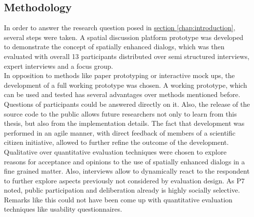 \subsection{Methodology}
\label{sub:method-discussion}
In order to answer the research question posed in \hyperref[chap:introduction]{section \ref{chap:introduction}}, several steps were taken. A spatial discussion platform prototype was developed to demonstrate the concept of spatially enhanced dialogs, which was then evaluated with overall 13 participants distributed over semi structured interviews, expert interviews and a focus group.\\
In opposition to methods like paper prototyping or interactive mock ups, the development of a full working prototype was chosen. A working prototype, which can be used and tested has several advantages over methods mentioned before. Questions of participants could be answered directly on it. Also, the release of the source code to the public allows future researchers not only to learn from this thesis, but also from the implementation details. The fact that development was performed in an agile manner, with direct feedback of members of a scientific citizen initiative, allowed to further refine the outcome of the development.\\
Qualitative over quantitative evaluation techniques were chosen to explore reasons for acceptance and opinions to the use of spatially enhanced dialogs in a fine grained matter. Also, interviews allow to dynamically react to the respondent to further explore aspects previously not considered by evaluation design. As P7 noted, public participation and deliberation already is highly socially selective. Remarks like this could not have been come up with quantitative evaluation techniques like usability questionnaires.\\

